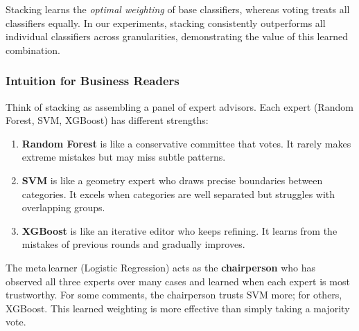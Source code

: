 \documentclass[12pt,a4paper,twoside]{article}
\theoremstyle{definition}
\begin{document}
\begin{notebox}
Stacking learns the \textit{optimal weighting} of base classifiers, whereas voting treats all classifiers equally. In our experiments, stacking consistently outperforms all individual classifiers across granularities, demonstrating the value of this learned combination.
\end{notebox}

\subsubsection{Intuition for Business Readers}
 
Think of stacking as assembling a panel of expert advisors. Each expert (Random Forest, SVM, XGBoost) has different strengths:
 
\begin{enumerate}[leftmargin=2em]
    \item \textbf{Random Forest} is like a conservative committee that votes. It rarely makes extreme mistakes but may miss subtle patterns.
    \item \textbf{SVM} is like a geometry expert who draws precise boundaries between categories. It excels when categories are well separated but struggles with overlapping groups.
    \item \textbf{XGBoost} is like an iterative editor who keeps refining. It learns from the mistakes of previous rounds and gradually improves.
\end{enumerate}
 
The meta\,learner (Logistic Regression) acts as the \textbf{chairperson} who has observed all three experts over many cases and learned when each expert is most trustworthy. For some comments, the chairperson trusts SVM more; for others, XGBoost. This learned weighting is more effective than simply taking a majority vote.
 
\end{document}
